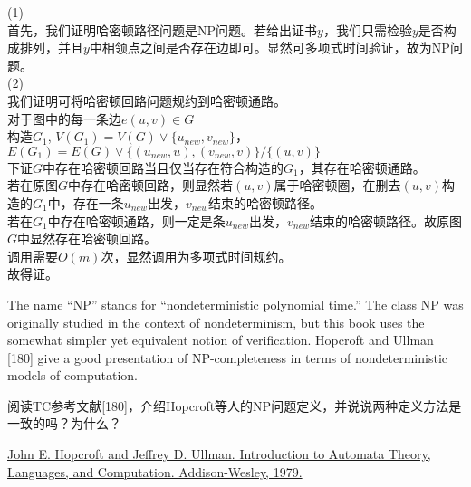 \documentclass[a4paper, justified]{tufte-handout}
\begin{document}
\begin{solution}
(1)\\
首先，我们证明哈密顿路径问题是NP问题。若给出证书$y$，我们只需检验$y$是否构成排列，并且$y$中相领点之间是否存在边即可。显然可多项式时间验证，故为NP问题。\\
(2)\\
我们证明可将哈密顿回路问题规约到哈密顿通路。\\
对于图中的每一条边$e(u,v)\in G$\\
构造$G_1$, $V(G_1)=V(G)\lor \{u_{new}, v_{new}\}$，$E(G_1) = E(G)\lor\{(u_{new}, u), (v_{new}, v)\}/\{(u,v)\}$\\
下证$G$中存在哈密顿回路当且仅当存在符合构造的$G_1$，其存在哈密顿通路。\\
若在原图$G$中存在哈密顿回路，则显然若$(u,v)$属于哈密顿圈，在删去$(u,v)$构造的$G_1$中，存在一条$u_{new}$出发，$v_{new}$结束的哈密顿路径。\\
若在$G_1$中存在哈密顿通路，则一定是条$u_{new}$出发，$v_{new}$结束的哈密顿路径。故原图$G$中显然存在哈密顿回路。\\
调用需要$O(m)$次，显然调用为多项式时间规约。\\
故得证。
\end{solution}
\beginoptional

\begin{problem}[TC 34.5-2]
\end{problem}

\begin{solution}
\end{solution}

\beginot
\begin{ot}[NP]	
	The name ``NP'' stands for ``nondeterministic polynomial time.'' The class NP was originally studied	in the context of nondeterminism, but this book uses the somewhat simpler yet equivalent notion of verification. 
	Hopcroft and Ullman [180] give a good presentation of NP-completeness in terms of nondeterministic models of computation.
	
	阅读TC参考文献[180]，介绍Hopcroft等人的NP问题定义，并说说两种定义方法是一致的吗？为什么？
	
	\href{http://ce.sharif.edu/courses/94-95/1/ce414-2/resources/root/Text\%20Books/Automata/John\%20E.\%20Hopcroft,\%20Rajeev\%20Motwani,\%20Jeffrey\%20D.\%20Ullman-Introduction\%20to\%20Automata\%20Theory,\%20Languages,\%20and\%20Computations-Prentice\%20Hall\%20(2006).pdf}{John E. Hopcroft and Jeffrey D. Ullman. Introduction to Automata Theory, Languages, and	Computation. Addison-Wesley, 1979.
}
\end{ot}
\end{document}
